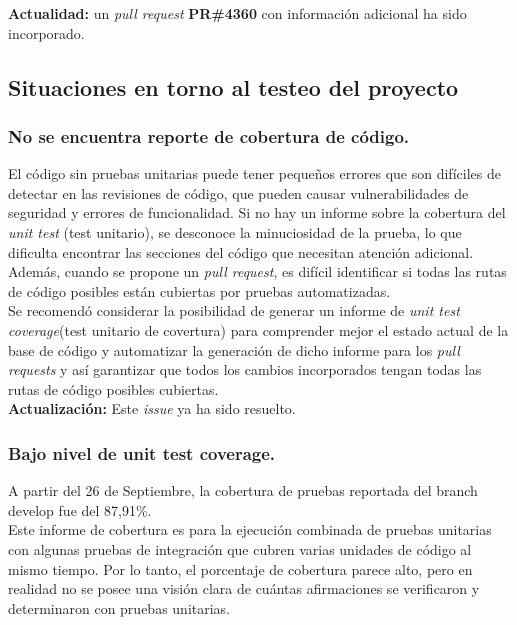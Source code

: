 \textbf{Actualidad:} un \textit{pull request} \textbf{PR\#4360}\cite{GHPR4360} con información adicional ha sido incorporado.

\subsection{Situaciones en torno al testeo del proyecto}

\subsubsection{No se encuentra reporte de cobertura de código.}

El código sin pruebas unitarias puede tener pequeños errores que son difíciles de detectar en las revisiones de código, que pueden causar vulnerabilidades de seguridad y errores de funcionalidad. Si no hay un informe sobre la cobertura del \textit{unit test} (test unitario), se desconoce la minuciosidad de la prueba, lo que dificulta encontrar las secciones del código que necesitan atención adicional. Además, cuando se propone un \textit{pull request}, es difícil identificar si todas las rutas de código posibles están cubiertas por pruebas automatizadas.\\

Se recomendó considerar la posibilidad de generar un informe de \textit{unit test coverage}(test unitario de covertura) para comprender mejor el estado actual de la base de código y automatizar la generación de dicho informe para los \textit{pull requests} y así garantizar que todos los cambios incorporados tengan todas las rutas de código posibles cubiertas.\\

\textbf{Actualización:} Este \textit{issue}\cite{GHI2663} ya ha sido resuelto.

\subsubsection{Bajo nivel de unit test coverage.}

A partir del 26 de Septiembre, la cobertura de pruebas reportada del branch develop\cite{CodeCovEthereumSolidityOld} fue del 87,91\%.\\

Este informe de cobertura es para la ejecución combinada de pruebas unitarias con algunas pruebas de integración que cubren varias unidades de código al mismo tiempo. Por lo tanto, el porcentaje de cobertura parece alto, pero en realidad no se posee una visión clara de cuántas afirmaciones se verificaron y determinaron con pruebas unitarias.\\

